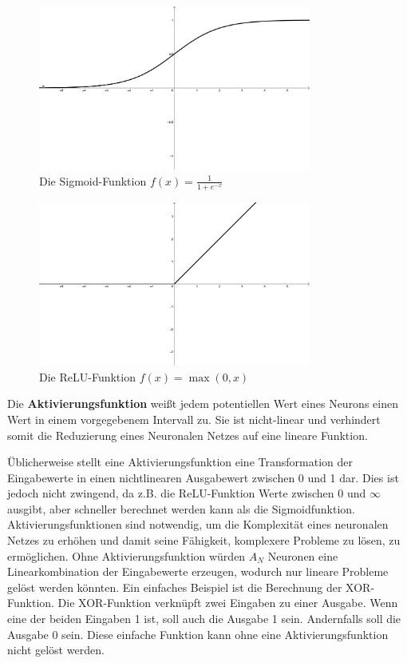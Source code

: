 \begin{figure}
    \centering
    \includegraphics[width=0.8\textwidth]{zeichnungen/sigmoid.png}
    \caption{Die Sigmoid-Funktion $f(x) = \frac{1}{1+e^{-x}}$}\label{img:sigmoid}
\end{figure}

\begin{figure}
    \centering
    \includegraphics[width=0.8\textwidth]{zeichnungen/relu.png}
    \caption{Die ReLU-Funktion $f(x) = \max(0,x)$}\label{img:relu}
\end{figure}

\begin{definition}\label{def:aktivierungsfunktion}
    Die \textbf{Aktivierungsfunktion} weißt jedem potentiellen Wert eines Neurons einen Wert in einem vorgegebenem Intervall zu.
    Sie ist nicht-linear und verhindert somit die Reduzierung eines Neuronalen Netzes auf eine lineare Funktion.
\end{definition}

Üblicherweise stellt eine Aktivierungsfunktion eine Transformation der Eingabewerte in einen nichtlinearen Ausgabewert zwischen 0 und 1 dar.
Dies ist jedoch nicht zwingend, da z.B. die ReLU-Funktion Werte zwischen 0 und $\infty$ ausgibt, aber schneller berechnet werden kann als die Sigmoidfunktion.
Aktivierungsfunktionen sind notwendig, um die Komplexität eines neuronalen Netzes zu erhöhen und damit seine Fähigkeit, komplexere Probleme zu lösen, zu ermöglichen.
Ohne Aktivierungsfunktion würden $A_N$ Neuronen eine Linearkombination der Eingabewerte erzeugen, wodurch nur lineare Probleme gelöst werden könnten.
Ein einfaches Beispiel ist die Berechnung der XOR-Funktion.
Die XOR-Funktion verknüpft zwei Eingaben zu einer Ausgabe. Wenn eine der beiden Eingaben 1 ist, soll auch die Ausgabe 1 sein.
Andernfalls soll die Ausgabe 0 sein.
Diese einfache Funktion kann ohne eine Aktivierungsfunktion nicht gelöst werden.\\

